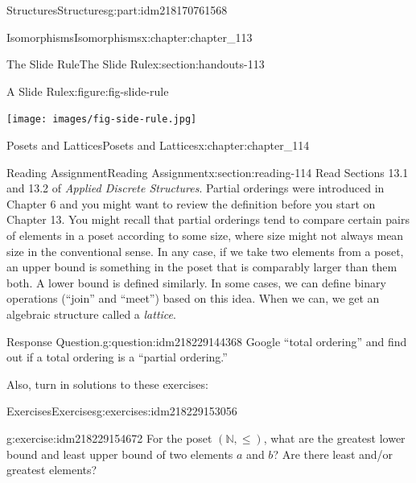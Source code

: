\documentclass[oneside,10pt,]{book}
\numberwithin{equation}{section}
\begin{document}
\begin{partptx}{Structures}{}{Structures}{}{}{g:part:idm218170761568}
\begin{chapterptx}{Isomorphisms}{}{Isomorphisms}{}{}{x:chapter:chapter_113}
\begin{sectionptx}{The Slide Rule}{}{The Slide Rule}{}{}{x:section:handouts-113}
\begin{figureptx}{A Slide Rule}{x:figure:fig-slide-rule}{}%
\begin{image}{0.25}{0.5}{0.25}%
\texttt{[image: images/fig-side-rule.jpg]}
\end{image}%
\tcblower
\end{figureptx}%
\end{sectionptx}
\end{chapterptx}
%
\typeout{************************************************}
\typeout{************************************************}
%
\begin{chapterptx}{Posets and Lattices}{}{Posets and Lattices}{}{}{x:chapter:chapter_114}
%
%
%
%
\typeout{************************************************}
\typeout{************************************************}
%
\begin{sectionptx}{Reading Assignment}{}{Reading Assignment}{}{}{x:section:reading-114}
Read Sections 13.1 and 13.2 of \emph{Applied Discrete Structures}. Partial orderings were introduced in Chapter 6 and you might want to review the definition before you start on Chapter 13. You might recall that partial orderings tend to compare certain pairs of elements in a poset according to some size, where size might not always mean size in the conventional sense.  In any case, if we take two elements from a poset, an upper bound is something in the poset that is comparably larger than them both.  A lower bound is defined similarly. In some cases, we can define binary operations (``join'' and ``meet'') based on this idea.  When we can, we get an algebraic structure called a \emph{lattice}.%
\begin{question}{Response Question.}{g:question:idm218229144368}%
Google “total ordering” and find out if a total ordering is a “partial ordering.”%
\end{question}
Also, turn in solutions to these exercises:%
%
%
\typeout{************************************************}
\typeout{************************************************}
%
\begin{exercises-subsection-numberless}{Exercises}{}{Exercises}{}{}{g:exercises:idm218229153056}
\begin{divisionexercise}{1}{}{}{g:exercise:idm218229154672}%
For the poset \((\mathbb{N},\leq )\), what are the greatest lower bound and least upper bound of two elements \(a\) and \(b\)? Are there least and\slash{}or greatest elements?%

\end{divisionexercise}
\end{exercises-subsection-numberless}
\end{sectionptx}
\end{chapterptx}
\end{partptx}
\end{document}
